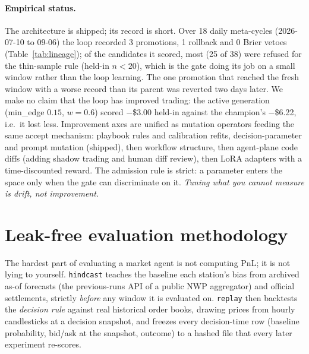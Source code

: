 \documentclass[sigconf,review,anonymous]{acmart}
\begin{document}
\paragraph{Empirical status.} The architecture is shipped; its record is
short. Over 18 daily meta-cycles (2026-07-10 to 09-06) the loop recorded 3
promotions, 1 rollback and 0 Brier vetoes (Table~\ref{tab:lineage}); of the
candidates it scored, most (25 of 38) were refused for the thin-sample rule
(held-in $n<20$), which is the gate doing its job on a small window rather than
the loop learning. The one promotion that reached the fresh window with a
worse record than its parent was reverted two days later. We make no claim
that the loop has improved trading: the active generation
(min\_edge $0.15$, $w=0.6$) scored $-$\$3.00 held-in against the champion's
$-$\$6.22, i.e.\ it lost less. Improvement axes are unified as
mutation operators feeding the same accept mechanism: playbook rules and
calibration refits, decision-parameter and prompt mutation (shipped), then
workflow structure, then agent-plane code diffs (adding shadow trading and
human diff review), then LoRA adapters with a time-discounted reward. The
admission rule is strict: a parameter enters the space only when the gate can
discriminate on it. \emph{Tuning what you cannot measure is drift, not
improvement.}

\section{Leak-free evaluation methodology}
\label{sec:eval}

The hardest part of evaluating a market agent is not computing PnL; it is not
lying to yourself. \texttt{hindcast} teaches the baseline each station's bias
from archived as-of forecasts (the previous-runs API of a public NWP aggregator)
and official settlements, strictly \emph{before} any window it is evaluated on.
\texttt{replay} then backtests the \emph{decision rule} against real historical
order books, drawing prices from hourly candlesticks at a decision snapshot,
and freezes every decision-time row (baseline probability, bid/ask at the
snapshot, outcome) to a hashed file that every later experiment re-scores.
\end{document}
